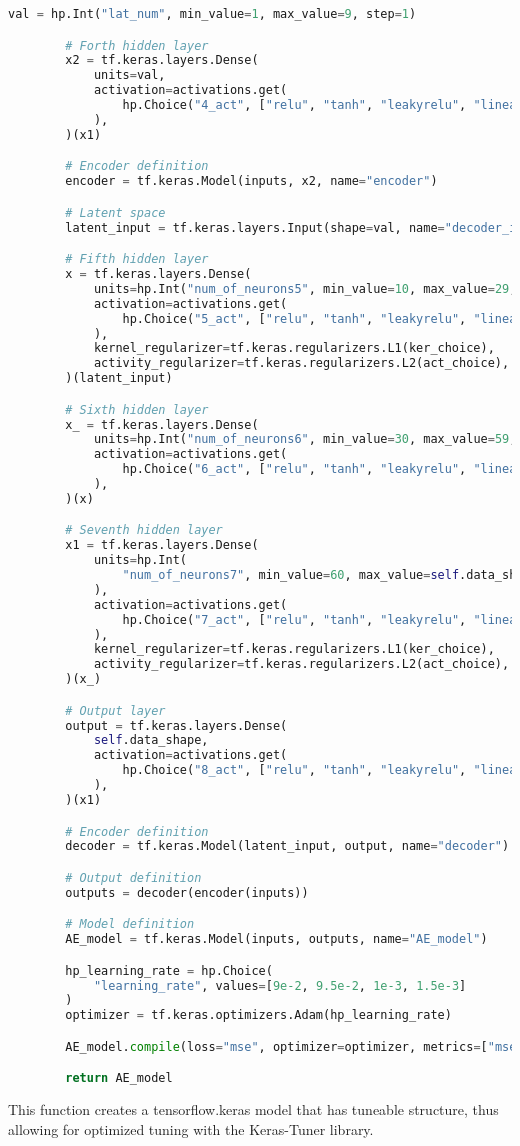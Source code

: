 \begin{lstlisting}[language=Python, style=pythonstyle, label={code:ae_code_arch}]
        val = hp.Int("lat_num", min_value=1, max_value=9, step=1)

        # Forth hidden layer
        x2 = tf.keras.layers.Dense(
            units=val,
            activation=activations.get(
                hp.Choice("4_act", ["relu", "tanh", "leakyrelu", "linear"])
            ),
        )(x1)

        # Encoder definition
        encoder = tf.keras.Model(inputs, x2, name="encoder")

        # Latent space
        latent_input = tf.keras.layers.Input(shape=val, name="decoder_input")

        # Fifth hidden layer
        x = tf.keras.layers.Dense(
            units=hp.Int("num_of_neurons5", min_value=10, max_value=29, step=1),
            activation=activations.get(
                hp.Choice("5_act", ["relu", "tanh", "leakyrelu", "linear"])
            ),
            kernel_regularizer=tf.keras.regularizers.L1(ker_choice),
            activity_regularizer=tf.keras.regularizers.L2(act_choice),
        )(latent_input)

        # Sixth hidden layer
        x_ = tf.keras.layers.Dense(
            units=hp.Int("num_of_neurons6", min_value=30, max_value=59, step=1),
            activation=activations.get(
                hp.Choice("6_act", ["relu", "tanh", "leakyrelu", "linear"])
            ),
        )(x)

        # Seventh hidden layer
        x1 = tf.keras.layers.Dense(
            units=hp.Int(
                "num_of_neurons7", min_value=60, max_value=self.data_shape - 1, step=1
            ),
            activation=activations.get(
                hp.Choice("7_act", ["relu", "tanh", "leakyrelu", "linear"])
            ),
            kernel_regularizer=tf.keras.regularizers.L1(ker_choice),
            activity_regularizer=tf.keras.regularizers.L2(act_choice),
        )(x_)

        # Output layer
        output = tf.keras.layers.Dense(
            self.data_shape,
            activation=activations.get(
                hp.Choice("8_act", ["relu", "tanh", "leakyrelu", "linear"])
            ),
        )(x1)

        # Encoder definition
        decoder = tf.keras.Model(latent_input, output, name="decoder")

        # Output definition
        outputs = decoder(encoder(inputs))

        # Model definition
        AE_model = tf.keras.Model(inputs, outputs, name="AE_model")

        hp_learning_rate = hp.Choice(
            "learning_rate", values=[9e-2, 9.5e-2, 1e-3, 1.5e-3]
        )
        optimizer = tf.keras.optimizers.Adam(hp_learning_rate)

        AE_model.compile(loss="mse", optimizer=optimizer, metrics=["mse"])

        return AE_model
    \end{lstlisting}

This function creates a tensorflow.keras model that has tuneable structure, thus allowing for optimized tuning with the Keras-Tuner 
library\cite{omalley2019kerastuner}.